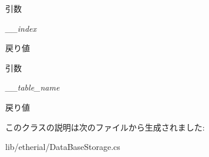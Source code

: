 \begin{DoxyParams}{引数}
\item[{\em \_\-\_\-index}]\end{DoxyParams}
\begin{DoxyReturn}{戻り値}

\end{DoxyReturn}



\begin{DoxyParams}{引数}
\item[{\em \_\-\_\-table\_\-name}]\end{DoxyParams}
\begin{DoxyReturn}{戻り値}

\end{DoxyReturn}


このクラスの説明は次のファイルから生成されました:\begin{DoxyCompactItemize}
\item 
lib/etherial/DataBaseStorage.cs\end{DoxyCompactItemize}
